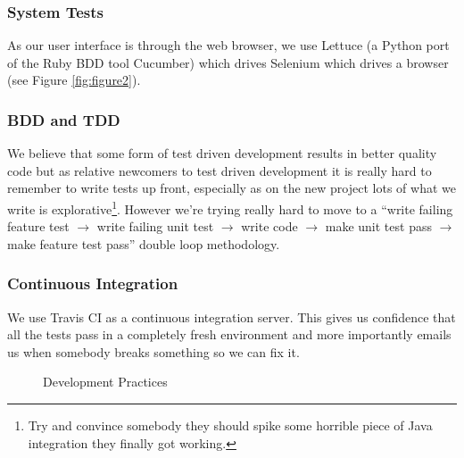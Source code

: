 \documentclass[11pt, a4paper]{article}
\begin{document}
\subsubsection{System Tests}
As our user interface is through the web browser, we use Lettuce (a Python port of the Ruby BDD tool Cucumber) which drives Selenium which drives a browser (see Figure \ref{fig:figure2}). 

\subsubsection{BDD and TDD}
We believe that some form of test driven development results in better quality code but as relative newcomers to test driven development it is really hard to remember to write tests up front, especially as on the new project lots of what we write is explorative\footnote{Try and convince somebody they should spike some horrible piece of Java integration they finally got working.}. However we're trying really hard to move to a ``write failing feature test $\rightarrow$ write failing unit test $\rightarrow$ write code $\rightarrow$ make unit test pass $\rightarrow$ make feature test pass'' double loop methodology.
\subsubsection{Continuous Integration}
We use Travis CI as a continuous integration server. This gives us confidence that all the tests pass in a completely fresh environment and more importantly emails us when somebody breaks something so we can fix it.

\begin{figure}[h]
\centering
{}
\quad
\centering
{}
\caption{Development Practices}
\label{fig:figure4}
\end{figure}
  
\end{document}
